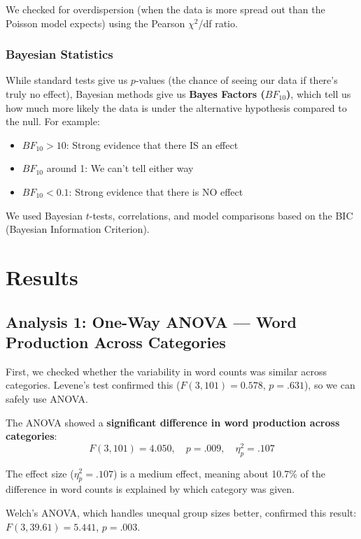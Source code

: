 \documentclass[12pt, a4paper]{article}
\begin{document}
We checked for overdispersion (when the data is more spread out than the Poisson model expects) using the Pearson $\chi^2$/df ratio.

\subsubsection{Bayesian Statistics}

While standard tests give us $p$-values (the chance of seeing our data if there's truly no effect), Bayesian methods give us \textbf{Bayes Factors ($BF_{10}$)}, which tell us how much more likely the data is under the alternative hypothesis compared to the null. For example:
\begin{itemize}[nosep]
    \item $BF_{10} > 10$: Strong evidence that there IS an effect
    \item $BF_{10}$ around 1: We can't tell either way
    \item $BF_{10} < 0.1$: Strong evidence that there is NO effect
\end{itemize}

We used Bayesian $t$-tests, correlations, and model comparisons based on the BIC (Bayesian Information Criterion).


\section{Results}

\subsection{Analysis 1: One-Way ANOVA --- Word Production Across Categories}

First, we checked whether the variability in word counts was similar across categories. Levene's test confirmed this ($F(3, 101) = 0.578$, $p = .631$), so we can safely use ANOVA.

The ANOVA showed a \textbf{significant difference in word production across categories}:
\[
F(3, 101) = 4.050, \quad p = .009, \quad \eta_p^2 = .107
\]

The effect size ($\eta_p^2 = .107$) is a medium effect, meaning about 10.7\% of the difference in word counts is explained by which category was given.

Welch's ANOVA, which handles unequal group sizes better, confirmed this result: $F(3, 39.61) = 5.441$, $p = .003$.
\end{document}
